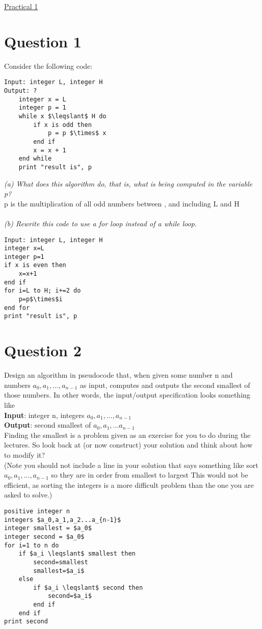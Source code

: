 \documentclass{article}[18pt]
\begin{document}
\begin{center}
\underline{\huge Practical 1}
\end{center}
\section{Question 1}
Consider the following code:
\begin{lstlisting}[mathescape=true]
Input: integer L, integer H
Output: ?
	integer x = L
	integer p = 1
	while x $\leqslant$ H do
		if x is odd then
			p = p $\times$ x
		end if
		x = x + 1
	end while
	print "result is", p
\end{lstlisting}
\textit{(a) What does this algorithm do, that is, what is being computed in the variable p?}\\
p is the multiplication of all odd numbers between , and including L and H\\
\\
\textit{(b) Rewrite this code to use a for loop instead of a while loop.}
\begin{lstlisting}[mathescape=true]
Input: integer L, integer H
integer x=L
integer p=1
if x is even then
	x=x+1
end if
for i=L to H; i+=2 do
	p=p$\times$i
end for
print "result is", p
\end{lstlisting}
\section{Question 2}
Design an algorithm in pseudocode that, when given some number n and
numbers $a_0, a_1, ... , a_{n-1}$ as input, computes and outputs the second smallest
of those numbers. In other words, the input/output specification looks
something like\\
\textbf{Input}: integer n, integers $a_0, a_1, . . . , a_{n-1}$\\
\textbf{Output}: second smallest of $a_0, a_1, . . . a_{n-1}$\\
Finding the smallest is a problem given as an exercise for you to do during
the lectures. So look back at (or now construct) your solution and think
about how to modify it?\\
(Note you should not include a line in your solution that says something
like sort $a_0, a_1, . . . , a_{n-1}$ so they are in order from smallest to largest
This would not be efficient, as sorting the integers is a more difficult problem
than the one you are asked to solve.)
\newpage
\begin{lstlisting}[mathescape=true]
positive integer n
integers $a_0,a_1,a_2...a_{n-1}$
integer smallest = $a_0$
integer second = $a_0$
for i=1 to n do
	if $a_i \leqslant$ smallest then
		second=smallest
		smallest=$a_i$
	else
		if $a_i \leqslant$ second then
			second=$a_i$
		end if
	end if
print second
\end{lstlisting}
\end{document}
